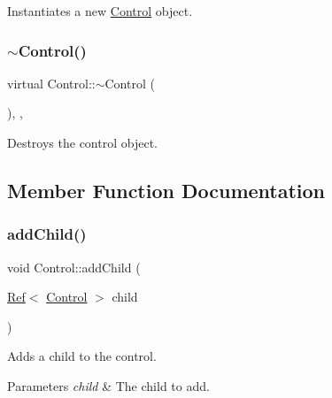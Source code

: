 Instantiates a new \mbox{\hyperlink{class_control}{Control}} object. 

\mbox{\label{class_control_a6423be6b157375ac59214eee86623b05}} 
\subsubsection{\texorpdfstring{$\sim$Control()}{~Control()}}
{\footnotesize\ttfamily virtual Control\+::$\sim$\+Control (\begin{DoxyParamCaption}{ }\end{DoxyParamCaption})\hspace{0.3cm}{\ttfamily [inline]}, {\ttfamily [override]}, {\ttfamily [virtual]}}



Destroys the control object. 



\subsection{Member Function Documentation}
\mbox{\label{class_control_a3cec54dc733e8609e0b816c4e9e9f99d}} 
\subsubsection{\texorpdfstring{addChild()}{addChild()}}
{\footnotesize\ttfamily void Control\+::add\+Child (\begin{DoxyParamCaption}\item[{\mbox{\hyperlink{class_ref}{Ref}}$<$ \mbox{\hyperlink{class_control}{Control}} $>$}]{child }\end{DoxyParamCaption})}



Adds a child to the control. 


\begin{DoxyParams}{Parameters}
{\em child} & The child to add.\\
\hline
\end{DoxyParams}
\mbox{\label{class_control_a2575b01d5c158f11986dea96ebc8b86e}} 
